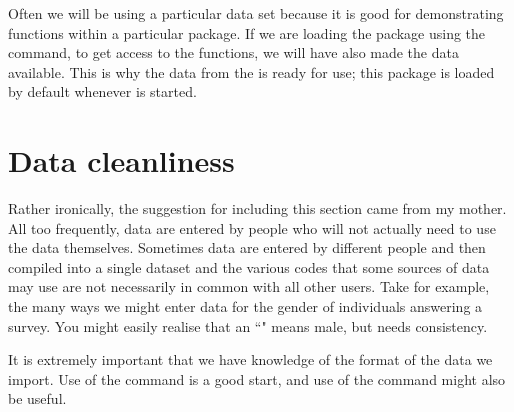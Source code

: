 Often we will be using a particular data set because it is good for demonstrating functions within a particular package. If we are loading the package using the  command, to get access to the functions, we will have also made the data available. This is why the data from the  is ready for use; this package is loaded by default whenever \R{} is started. 
 
 
\section{Data cleanliness} 
 
Rather ironically, the suggestion for including this section came from my mother. All too frequently, data are entered by people who will not actually need to use the data themselves. Sometimes data are entered by different people and then compiled into a single dataset and the various codes that some sources of data may use are not necessarily in common with all other users. Take for example, the many ways we might enter data for the gender of individuals answering a survey. You might easily realise that an ``" means male, but \R{} needs consistency. 
 
It is extremely important that we have knowledge of the format of the data we import. Use of the  command is a good start, and use of the  command might also be useful. 
 
